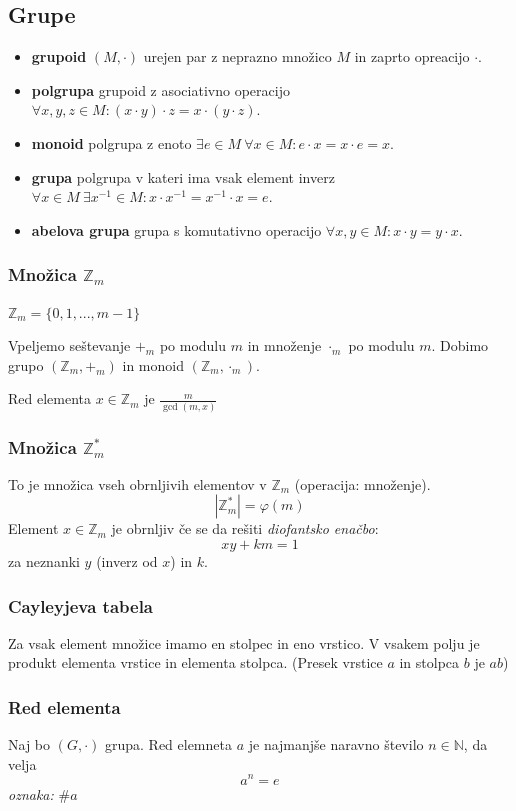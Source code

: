 \begin{multicols}{5}
\subsection*{Grupe}
\begin{itemize}
    \item \textbf{grupoid} $(M, \cdot)$ urejen par z neprazno množico $M$ in zaprto opreacijo $\cdot$.
    \item \textbf{polgrupa} grupoid z asociativno operacijo $ \forall x,y,z \in M : (x\cdot y)\cdot z = x\cdot (y\cdot z)$.
    \item \textbf{monoid} polgrupa z enoto $ \exists e \in M \ \forall x \in M : e\cdot x = x\cdot e = x$.
    \item \textbf{grupa} polgrupa v kateri ima vsak element inverz $ \forall x \in M \ \exists x^{-1} \in M : x\cdot x^{-1} = x^{-1}\cdot x = e$.
    \item \textbf{abelova grupa} grupa s komutativno operacijo $ \forall x,y \in M  : x\cdot y = y\cdot x$.
\end{itemize} 

\subsubsection{Množica $\mathbb{Z}_m$}
$\mathbb{Z}_m = \{0,1,...,m-1\}$

Vpeljemo seštevanje $+_m$ po modulu $m$ in množenje $\cdot_m$ po modulu $m$. 
Dobimo grupo $(\mathbb{Z}_m, +_m)$ in monoid $(\mathbb{Z}_m, \cdot_m)$.

Red elementa $x\in \mathbb{Z}_m$ je $\frac{m}{\gcd(m,x)}$

\subsubsection{Množica $\mathbb{Z}_m^*$}
To je množica vseh obrnljivih elementov v $\mathbb{Z}_m$ (operacija: množenje).
\[|\mathbb{Z}^*_m| = \varphi(m)\]
Element $x\in \mathbb{Z}_m$ je obrnljiv če se da rešiti \emph{diofantsko enačbo}:
\[ xy + km = 1\]
za neznanki $y$ (inverz od $x$) in $k$.

\subsubsection{Cayleyjeva tabela}
Za vsak element množice imamo en stolpec in eno vrstico. V vsakem polju je produkt elementa vrstice in elementa stolpca.
(Presek vrstice $a$ in stolpca $b$ je $ab$)

\subsubsection{Red elementa}
Naj bo $(G,\cdot)$ grupa. Red elemneta $a$ je najmanjše naravno število $n \in \mathbb{N}$, da velja
\[a^n = e\]
\textit{oznaka:} $\#a$


\end{multicols}

